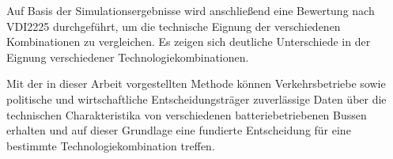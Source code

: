 Auf Basis der Simulationsergebnisse wird anschließend eine Bewertung nach VDI2225 durchgeführt, um die technische Eignung der verschiedenen Kombinationen zu vergleichen. Es zeigen sich deutliche Unterschiede in der Eignung verschiedener Technologiekombinationen.

Mit der in dieser Arbeit vorgestellten Methode können Verkehrsbetriebe sowie politische und wirtschaftliche Entscheidungsträger zuverlässige Daten über die technischen Charakteristika von verschiedenen batteriebetriebenen Bussen erhalten und auf dieser Grundlage eine fundierte Entscheidung für eine bestimmte Technologiekombination treffen.